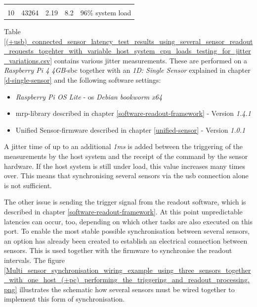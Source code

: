 \begin{longtable}[]{@{}lllll@{}}
\begin{minipage}[t]{0.10\columnwidth}
\strut
\end{minipage}\tabularnewline
\begin{minipage}[t]{0.08\columnwidth}\raggedright
10\strut
\end{minipage} & \begin{minipage}[t]{0.11\columnwidth}\raggedright
43264\strut
\end{minipage} & \begin{minipage}[t]{0.35\columnwidth}\raggedright
2.19\strut
\end{minipage} & \begin{minipage}[t]{0.22\columnwidth}\raggedright
8.2\strut
\end{minipage} & \begin{minipage}[t]{0.10\columnwidth}\raggedright
96\% system load\strut
\end{minipage}\tabularnewline
\bottomrule
\end{longtable}

Table
\ref{(+usb)_connected_sensor_latency_test_results_using_several_sensor_readout_requests_togehter_with_variable_host_system_cpu_loads_testing_for_jitter_variations.csv}
contains various jitter measurements. These are performed on a
\emph{Raspberry Pi 4 4GB}-\gls{sbc} together with an \emph{1D: Single
Sensor} explained in chapter \ref{d-single-sensor} and the following
software settings:

\begin{itemize}
\tightlist
\item
  \emph{Raspberry Pi OS Lite} - \gls{os} \emph{Debian bookworm x64}
\item
  \gls{mrp}-library described in chapter
  \ref{software-readout-framework} - Version \emph{1.4.1}
\item
  Unified Sensor-firmware described in chapter \ref{unified-sensor} -
  Version \emph{1.0.1}
\end{itemize}

A jitter time of up to an additional \emph{1ms} is added between the
triggering of the measurements by the host system and the receipt of the
command by the sensor hardware. If the host system is still under load,
this value increases many times over. This means that synchronising
several sensors via the \gls{usb} connection alone is not sufficient.

The other issue is sending the trigger signal from the readout software,
which is described in chapter \ref{software-readout-framework}. At this
point unpredictable latencies can occur, too, depending on which other
tasks are also executed on this port. \newpage To enable the most stable
possible synchronisation between several sensors, an option has already
been created to establish an electrical connection between sensors. This
is used together with the firmware to synchronise the readout intervals.
The figure
\ref{Multi_sensor_synchronisation_wiring_example_using_three_sensors_together_with_one_host_(+pc)_performing_the_triggering_and_readout_processing.png}
illustrates the schematic how several sensors must be wired together to
implement this form of synchronisation.

